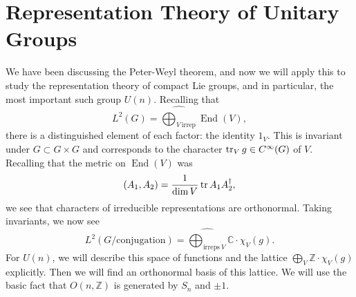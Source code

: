 \documentclass[leqno, openany]{memoir}
\theoremstyle{definition}
\theoremstyle{remark}
\theoremstyle{plain}
\theoremstyle{definition}
\theoremstyle{remark}
\newcommand{\C}{\mathbb{C}}
\newcommand{\Z}{\mathbb{Z}}
\newcommand{\wh}[1]{\widehat{#1}}
\DeclareMathOperator{\End}{End}
\begin{document}
\section{Representation Theory of Unitary Groups}%
\label{sec:representation_theory_of_unitary_groups}

We have been discussing the Peter-Weyl theorem, and now we will apply this to study the representation theory of compact Lie groups, and in particular, the most important such group $U(n)$. Recalling that 
\[ L^2(G) = \wh{\bigoplus_{V\ \text{irrep}}} \End(V), \]
there is a distinguished element of each factor: the identity $1_V$. This is invariant under $G \subset G \times G$ and corresponds to the character $\tr_V g \in C^{\infty}(G)$ of $V$. Recalling that the metric on $\End(V)$ was
\[ (A_1, A_2) = \frac{1}{\dim V} \tr A_1 A_2^{\dag}, \]
we see that characters of irreducible representations are orthonormal. Taking invariants, we now see
\[ L^2(G/\text{conjugation}) = \wh{\bigoplus_{\text{irreps}\ V}} \C \cdot \chi_V(g). \]
For $U(n)$, we will describe this space of functions and the lattice $\bigoplus_V \Z \cdot \chi_V(g)$ explicitly. Then we will find an orthonormal basis of this lattice. We will use the basic fact that $O(n, \Z)$ is generated by $S_n$ and $\pm 1$.
\end{document}
